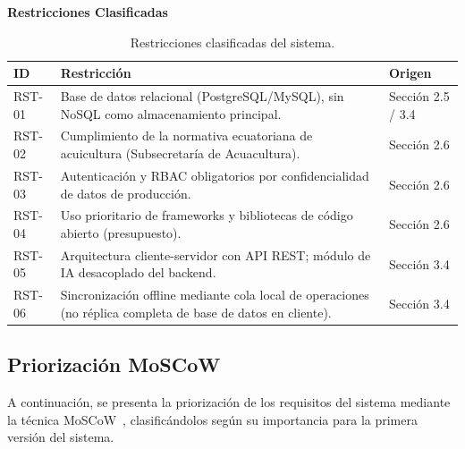 \documentclass[11pt,a4paper]{article}
\begin{document}
\textbf{Restricciones Clasificadas}
\begin{longtable}{|p{2.5cm}|p{8cm}|p{4cm}|}
\caption{Restricciones clasificadas del sistema.}
\label{tab:restricciones-clasificadas} \\
\hline



\textbf{ID} & \textbf{Restricción} & \textbf{Origen} \\ \hline

RST-01 & Base de datos relacional (PostgreSQL/MySQL), sin NoSQL como almacenamiento principal. & Sección 2.5 / 3.4 \\ \hline

RST-02 & Cumplimiento de la normativa ecuatoriana de acuicultura (Subsecretaría de Acuacultura). & Sección 2.6 \\ \hline

RST-03 & Autenticación y RBAC obligatorios por confidencialidad de datos de producción. & Sección 2.6 \\ \hline

RST-04 & Uso prioritario de frameworks y bibliotecas de código abierto (presupuesto). & Sección 2.6 \\ \hline

RST-05 & Arquitectura cliente-servidor con API REST; módulo de IA desacoplado del backend. & Sección 3.4 \\ \hline

RST-06 & Sincronización offline mediante cola local de operaciones (no réplica completa de base de datos en cliente). & Sección 3.4 \\ \hline

\end{longtable}

\subsection{Priorización MoSCoW}
A continuación, se presenta la priorización de los requisitos del sistema mediante la técnica MoSCoW~\cite{moscow_prioritization_2023}, clasificándolos según su importancia para la primera versión del sistema.
\end{document}
